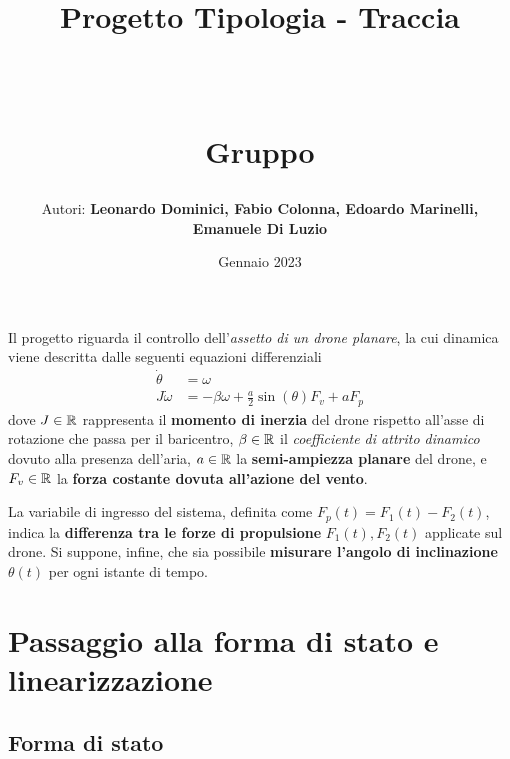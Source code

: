 \documentclass[a4paper, 11pt]{article}
\title{ \vspace{-1in}
		\huge \strut \coursename \strut \\
		\Large  \strut Progetto Tipologia \tipology - Traccia \trace \\
		\Large  \strut \projectname\strut \\
		\Large  \strut Gruppo \group\strut
		\vspace{-0.4cm}
}
\author{Autori: \textbf{Leonardo Dominici, Fabio Colonna, Edoardo Marinelli, Emanuele Di Luzio}}
\date{Gennaio 2023}
\begin{document}
\maketitle

Il progetto riguarda il controllo dell'\textit{assetto di un drone planare}, la cui dinamica viene descritta dalle seguenti equazioni differenziali 
%
\begin{subequations}\label{eq:system}
\begin{align}
	\dot \theta & = \omega 
	\\
	J \dot \omega & = -\beta \omega + \frac{a}{2} \sin(\theta) F_v + a F_p
\end{align}
\end{subequations}
%
dove $J \in \mathbb{R}$ rappresenta il \textbf{momento di inerzia} del drone rispetto all'asse di rotazione che passa per il baricentro, $\beta \in \mathbb{R}$ il \textit{coefficiente di attrito dinamico} dovuto alla presenza dell'aria, $a \in \mathbb{R}$ la \textbf{semi-ampiezza planare} del drone, e $F_v \in \mathbb{R}$ la \textbf{forza costante dovuta all'azione del vento}.

\bb

La variabile di ingresso del sistema, definita come $F_p(t) = F_1(t) - F_2(t)$, indica la \textbf{differenza tra le forze di propulsione} $F_1(t), F_2(t)$ applicate sul drone. Si suppone, infine, che sia possibile \textbf{misurare l'angolo di inclinazione} $\theta(t)$ per ogni istante di tempo.


\section{Passaggio alla forma di stato e linearizzazione}
\subsection{Forma di stato}
\end{document}
